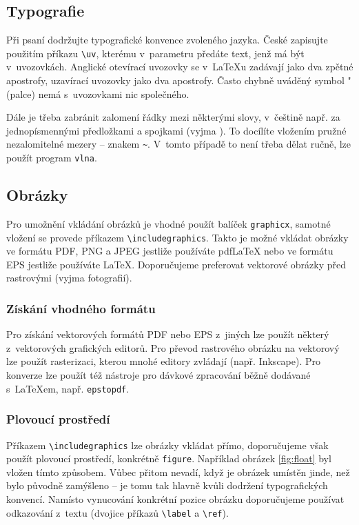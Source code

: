 \documentclass[thesis=B,czech]{FITthesis}[2011/06/14]
\begin{document}
 \subsection{Typografie}
 
 Při psaní dodržujte typografické konvence zvoleného jazyka. České  zapisujte použitím příkazu \verb|\uv|, kterému v~parametru předáte text, jenž má být v~uvozovkách. Anglické otevírací uvozovky se v~\LaTeX{}u zadávají jako dva zpětné apostrofy, uzavírací uvozovky jako dva apostrofy. Často chybně uváděný symbol "{} (palce) nemá s~uvozovkami nic společného.
 
 Dále je třeba zabránit zalomení řádky mezi některými slovy, v~češtině např. za jednopísmennými předložkami a spojkami (vyjma ). To docílíte vložením pružné nezalomitelné mezery -- znakem \texttt{\textasciitilde}. V~tomto případě to není třeba dělat ručně, lze použít program \verb|vlna|.
 
 
 \subsection{Obrázky}
 
 Pro umožnění vkládání obrázků je vhodné použít balíček \verb|graphicx|, samotné vložení se provede příkazem \verb|\includegraphics|. Takto je možné vkládat obrázky ve formátu PDF, PNG a JPEG jestliže používáte pdf\LaTeX{} nebo ve formátu EPS jestliže používáte \LaTeX{}. Doporučujeme preferovat vektorové obrázky před rastrovými (vyjma fotografií).
 
 \subsubsection{Získání vhodného formátu}
 
 Pro získání vektorových formátů PDF nebo EPS z~jiných lze použít některý z~vektorových grafických editorů. Pro převod rastrového obrázku na vektorový lze použít rasterizaci, kterou mnohé editory zvládají (např. Inkscape). Pro konverze lze použít též nástroje pro dávkové zpracování běžně dodávané s~\LaTeX{}em, např. \verb|epstopdf|.
 
 \subsubsection{Plovoucí prostředí}
 
 Příkazem \verb|\includegraphics| lze obrázky vkládat přímo, doporučujeme však použít plovoucí prostředí, konkrétně \verb|figure|. Například obrázek \ref{fig:float} byl vložen tímto způsobem. Vůbec přitom nevadí, když je obrázek umístěn jinde, než bylo původně zamýšleno -- je tomu tak hlavně kvůli dodržení typografických konvencí. Namísto vynucování konkrétní pozice obrázku doporučujeme používat odkazování z~textu (dvojice příkazů \verb|\label| a \verb|\ref|).
 
\end{document}
